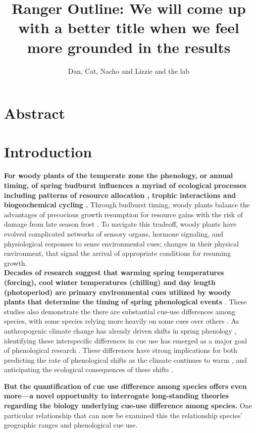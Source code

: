 \documentclass[12pt]{article}\usepackage[]{graphicx}\usepackage[]{color}
\title{Ranger Outline: We will come up with a better title when we feel more grounded in the results}
\date{}
\author{Dan, Cat, Nacho and Lizzie and the lab}
\begin{document}
\maketitle

\section*{Abstract}
\section*{Introduction}
\textbf{For woody plants of the temperate zone the phenology, or annual timing, of spring budburst influences a myriad of ecological processes including patterns of resource allocation \citep{}, trophic interactions \citep{} and biogeochemical cycling \citep{}.}
 Through budburst timing, woody plants balance the advantages of precocious growth resumption for resource gains with the risk of damage from late season frost \citep{}. To navigate this tradeoff, woody plants have evolved complicated networks of sensory organs, hormone signaling, and physiological responses to sense environmental cues; changes in their physical environment, that signal the arrival of appropriate conditions for resuming growth.\\

\textbf{Decades of research suggest that warming spring temperatures (forcing), cool winter temperatures (chilling) and day length (photoperiod) are primary environmental cues utilized by woody plants that determine the timing of spring phenological events \cite{}}. These studies also demonstrate the there are substantial cue-use differences among species, with some species relying more heavily on some cues over others \citep{Laube:2014aa}. As anthropogenic climate change has already driven shifts in spring phenology \citep{}, identifying these interspecific differences in cue use has emerged as a major goal of phenological research \citep{}. These differences have strong implications for both predicting the rate of phenological shifts as the climate continues to warm \citep{}, and anticipating the ecological consequences of these shifts \citep{}.

\textbf{ But the quantification of cue use difference among species offers even more---a novel opportunity to interrogate long-standing theories regarding the biology underlying cue-use difference among species.} One particular relationship that can now be examined this the relationship species' geographic ranges and phenological cue use.
\end{document}
